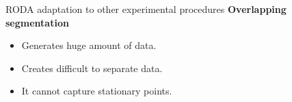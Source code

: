 \documentclass{beamer}
\newlength{\tmpShadow}
\newcommand{\MyShadow}[2]{%
	\settowidth{\tmpShadow}{#1}
	\addtolength{\tmpShadow}{.1em}
	\raisebox{-0.25ex}{\textcolor{gray!70}{#1}}%
	\kern-\tmpShadow%
	\textcolor{#2}{#1}%
}
\begin{document}
{\begin{frame}{RODA adaptation to other experimental procedures}
	\textbf{Overlapping segmentation}
	\vspace{18mm}	
	\begin{itemize}[label={\MyShadow{$\bullet$}{blue!80}}]
		\item Generates huge amount of data.
		\vspace{3mm}
		\item Creates difficult to separate data.
		\vspace{3mm}
		\item It cannot capture stationary points.
	\end{itemize}	
	\vspace{30mm}
\end{frame}

}
\end{document}
